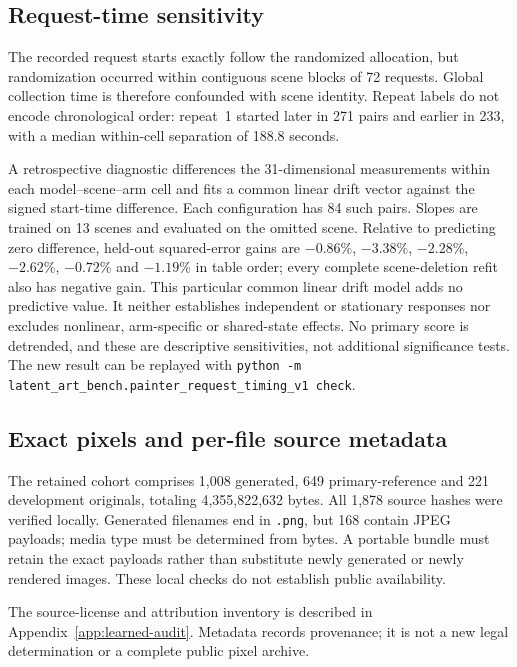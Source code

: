\subsection{Request-time sensitivity}
The recorded request starts exactly follow the randomized allocation, but
randomization occurred within contiguous scene blocks of 72 requests. Global
collection time is therefore confounded with scene identity. Repeat labels do
not encode chronological order: repeat~1 started later in 271 pairs and earlier
in 233, with a median within-cell separation of 188.8 seconds.

A retrospective diagnostic differences the 31-dimensional measurements within
each model--scene--arm cell and fits a common linear drift vector against the
signed start-time difference. Each configuration has 84 such pairs. Slopes are
trained on 13 scenes and evaluated on the omitted scene. Relative to predicting
zero difference, held-out squared-error gains are $-0.86\%$, $-3.38\%$,
$-2.28\%$, $-2.62\%$, $-0.72\%$ and $-1.19\%$ in table order; every complete
scene-deletion refit also has negative gain. This particular common linear
drift model adds no predictive value. It neither establishes independent or
stationary responses nor excludes nonlinear, arm-specific or shared-state
effects. No primary score is detrended, and these are descriptive sensitivities,
not additional significance tests. The new result can be replayed with
\texttt{python -m latent\_art\_bench.painter\_request\_timing\_v1 check}.

\subsection{Exact pixels and per-file source metadata}
The retained cohort comprises 1,008 generated, 649 primary-reference and 221
development originals, totaling 4,355,822,632 bytes. All 1,878 source hashes were
verified locally. Generated filenames end in \texttt{.png}, but 168 contain JPEG
payloads; media type must be determined from bytes. A portable bundle must retain
the exact payloads rather than substitute newly generated or newly rendered
images. These local checks do not establish public availability.

The source-license and attribution inventory is described in
Appendix~\ref{app:learned-audit}. Metadata records provenance; it is not a new
legal determination or a complete public pixel archive.

